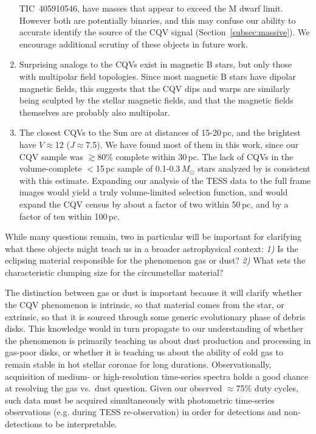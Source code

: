 \documentclass[11pt,twocolumn,tighten]{aastex63}
\begin{document}
\begin{enumerate}[leftmargin=*]
      TIC~405910546, have masses that appear to exceed the M dwarf
      limit.  However both are potentially binaries, and this may
      confuse our ability to accurate identify the source of the CQV
      signal (Section~\ref{subsec:massive}).  We encourage additional
      scrutiny of these objects in future work.
    \item Surprising analogs to the CQVs exist in magnetic B stars,
      but only those with multipolar field topologies.  Since most
      magnetic B stars have dipolar magnetic fields, this suggests
      that the CQV dips and warps are similarly being sculpted by the
      stellar magnetic fields, and that the magnetic fields themselves
      are probably also multipolar.
    \item The closest CQVs to the Sun are at distances of 15-20\,pc,
      and the brightest have $V$$\approx$12 ($J$$\approx$7.5).  We
      have found most of them in this work, since our CQV sample was
      $\gtrsim$80\% complete within 30\,pc.  The lack of CQVs in the
      volume-complete $<$15\,pc sample of 0.1-0.3\,$M_\odot$ stars
      analyzed by \citet{2021AJ....161...63W} is consistent with this
      estimate.  Expanding our analysis of the TESS data to the full
      frame images would yield a truly volume-limited selection
      function, and would expand the CQV census by about a factor of
      two within 50\,pc, and by a factor of ten within 100\,pc.
\end{enumerate}

While many questions remain, two in particular will be important for
clarifying what these objects might teach us in a broader
astrophysical context: {\it 1)} Is the eclipsing material responsible
for the phenomenon gas or dust?  {\it 2)} What sets the characteristic
clumping size for the circumstellar material?

The distinction between gas or dust is important because it will
clarify whether the CQV phenomenon is intrinsic, so that material
comes from the star, or extrinsic, so that it is sourced through some
generic evolutionary phase of debris disks.  This knowledge would in
turn propagate to our understanding of whether the phenomenon is
primarily teaching us about dust production and processing in gas-poor
disks, or whether it is teaching us about the ability of cold gas to
remain stable in hot stellar coronae for long durations.
Observationally, acquisition of medium- or high-resolution time-series
spectra holds a good chance at resolving the gas vs.~dust question.
Given our observed $\approx$75\% duty cycles, such data must be
acquired simultaneously with photometric time-series observations
(e.g. during TESS re-observation) in order for detections and
non-detections to be interpretable.
\end{document}
